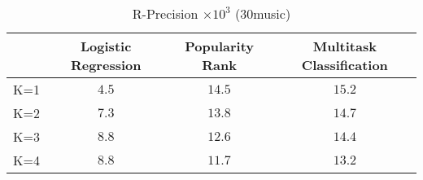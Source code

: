 \begin{table}[!h]
\centering
\caption{R-Precision $\times 10^3$ (30music)}
\label{tab:hitrate_pla_30music}
\begin{tabular}{l|*{3}{c|}}
\toprule
{} & Logistic Regression & Popularity Rank & Multitask Classification \\
\midrule
K=1 &               $4.5$ &          $14.5$ &                   $15.2$ \\
K=2 &               $7.3$ &          $13.8$ &                   $14.7$ \\
K=3 &               $8.8$ &          $12.6$ &                   $14.4$ \\
K=4 &               $8.8$ &          $11.7$ &                   $13.2$ \\
\bottomrule
\end{tabular}
\end{table}

